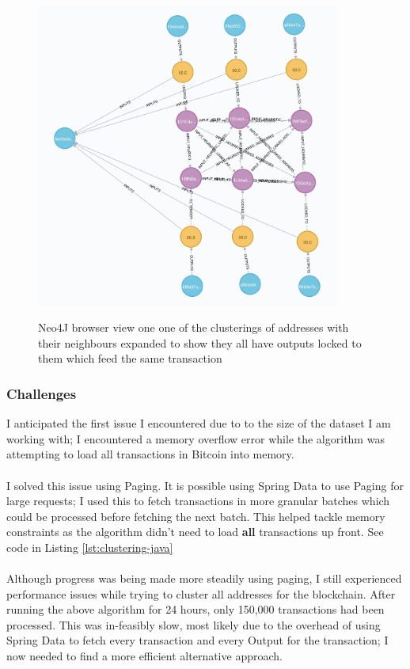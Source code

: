 \begin{figure}[h!]
  \centering
  \includegraphics[width = 10cm]{./figures/input-one-tx-heuristic-1}\\[0.5cm] 
  \caption{Neo4J browser view one one of the clusterings of addresses with their neighbours expanded to show they all have outputs locked to them which feed the same transaction}
  \label{fig:neo4j-1-tx-heuristic-1-cluster}
\end{figure}


\subsubsection{Challenges}

I anticipated the first issue I encountered due to to the size of the dataset I am working with; I encountered a memory overflow error while the algorithm was attempting to load all transactions in Bitcoin into memory. 
\\\\
I solved this issue using Paging. It is possible using Spring Data to use Paging for large requests; I used this to fetch transactions in more granular batches which could be processed before fetching the next batch. This helped tackle memory constraints as the algorithm didn't need to load \textbf{all} transactions up front. See code in Listing \ref{lst:clustering-java}
\\\\
Although progress was being made more steadily using paging, I still experienced performance issues while trying to cluster all addresses for the blockchain. After running the above algorithm for 24 hours, only 150,000 transactions had been processed. This was in-feasibly slow, most likely due to the overhead of using Spring Data to fetch every transaction and every Output for the transaction; I now needed to find a more efficient alternative approach. 
\\\\

